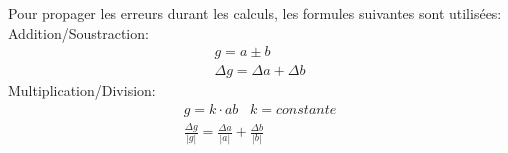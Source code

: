 Pour propager les erreurs durant les calculs, les formules suivantes sont utilisées:\\
Addition/Soustraction:
\begin{equation}
    \begin{split}
	g = a \pm b\\
	\Delta g = \Delta a + \Delta b
    \end{split}
\end{equation}
Multiplication/Division:
\begin{equation}
    \label{multdiv}
    \begin{split}
	g = k\cdot ab \;\;\; k=constante\\
	\frac{\Delta g}{|g|} = \frac{\Delta a}{|a|} + \frac{\Delta b}{|b|}
    \end{split}
\end{equation}

